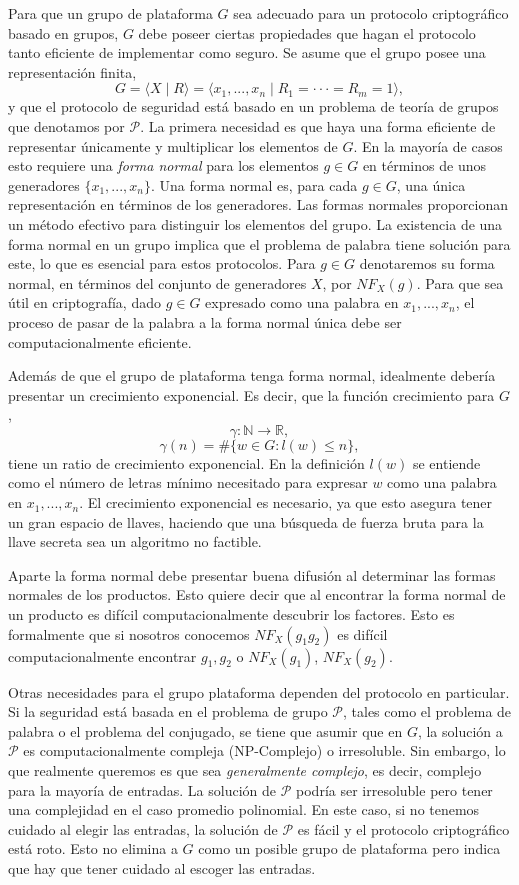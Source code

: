 \documentclass[12pt]{book}
\theoremstyle{definition}
\begin{document}
Para que un grupo de plataforma $G$ sea adecuado para un protocolo criptográfico basado en grupos, $G$ debe poseer ciertas propiedades que hagan el protocolo tanto eficiente de implementar como seguro. Se asume que el grupo posee una representación finita,
$$G = \langle X\mid R\rangle=\langle x_1,...,x_n\mid R_1=\cdot\cdot\cdot=R_m=1\rangle,$$
y que el protocolo de seguridad está basado en un problema de teoría de grupos que denotamos por $\mathcal{P}$. La primera necesidad es que haya una forma eficiente de representar únicamente y multiplicar los elementos de $G$. En la mayoría de casos esto requiere una \textit{forma normal} para los elementos $g\in G$ en términos de unos generadores $\{x_1,...,x_n\}$. Una forma normal es, para cada $g\in G$, una única representación en términos de los generadores. Las formas normales proporcionan un método efectivo para distinguir los elementos del grupo. La existencia de una forma normal en un grupo implica que el problema de palabra tiene solución para este, lo que es esencial para estos protocolos. Para $g\in G$ denotaremos su forma normal, en términos del conjunto de generadores $X$, por $NF_X(g)$. Para que sea útil en criptografía, dado $g\in G$ expresado como una palabra en $x_1,...,x_n$, el proceso de pasar de la palabra a la forma normal única debe ser computacionalmente eficiente.

Además de que el grupo de plataforma tenga forma normal, idealmente debería presentar un crecimiento exponencial. Es decir, que la función crecimiento para $G$,
$$\gamma:\mathbb{N}\rightarrow\mathbb{R},$$
$$\gamma(n)=\#\{w\in G:l(w)\leq n\},$$
tiene un ratio de crecimiento exponencial. En la definición $l(w)$ se entiende como el número de letras mínimo necesitado para expresar $w$ como una palabra en $x_1,...,x_n$. El crecimiento exponencial es necesario, ya que esto asegura tener un gran espacio de llaves, haciendo que una búsqueda de fuerza bruta para la llave secreta sea un algoritmo no factible.

Aparte la forma normal debe presentar buena difusión al determinar las formas normales de los productos. Esto quiere decir que al encontrar la forma normal de un producto es difícil computacionalmente descubrir los factores. Esto es formalmente que si nosotros conocemos $NF_X(g_1g_2)$ es difícil computacionalmente encontrar $g_1,g_2$ o $NF_X(g_1)$, $NF_X(g_2)$.

Otras necesidades para el grupo plataforma dependen del protocolo en particular. Si la seguridad está basada en el problema de grupo $\mathcal{P}$, tales como el problema de palabra o el problema del conjugado, se tiene que asumir que en $G$, la solución a $\mathcal{P}$ es computacionalmente compleja (NP-Complejo) o irresoluble. Sin embargo, lo que realmente queremos es que sea \textit{generalmente complejo}, es decir, complejo para la mayoría de entradas. La solución de $\mathcal{P}$ podría ser irresoluble pero tener una complejidad en el caso promedio polinomial. En este caso, si no tenemos cuidado al elegir las entradas, la solución de $\mathcal{P}$ es fácil y el protocolo criptográfico está roto. Esto no elimina a $G$ como un posible grupo de plataforma pero indica que hay que tener cuidado al escoger las entradas.
\end{document}
